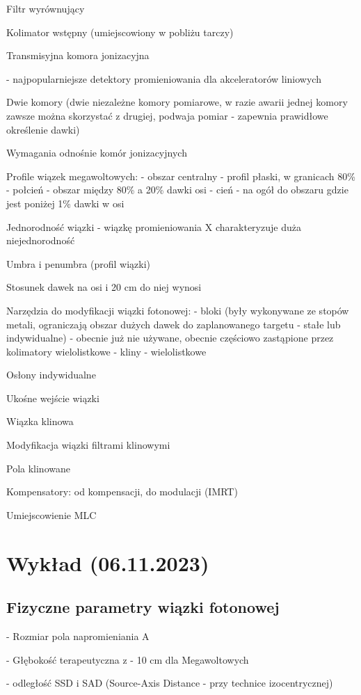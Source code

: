 \documentclass{article}
\begin{document}
Filtr wyrównujący

Kolimator wstępny (umiejscowiony w pobliżu tarczy)

Transmisyjna komora jonizacyjna

- najpopularniejsze detektory promieniowania dla akceleratorów liniowych

Dwie komory (dwie niezależne komory pomiarowe, w razie awarii jednej komory zawsze można skorzystać z drugiej, podwaja pomiar - zapewnia prawidłowe określenie dawki)

Wymagania odnośnie komór jonizacyjnych

Profile wiązek megawoltowych:
- obszar centralny - profil płaski, w granicach 80\%
- połcień - obszar między 80\% a 20\% dawki osi
- cień - na ogół do obszaru gdzie jest poniżej 1\% dawki w osi

Jednorodność wiązki - wiązkę promieniowania X charakteryzuje duża niejednorodność

Umbra i penumbra (profil wiązki)

Stosunek dawek na osi i 20 cm do niej wynosi

Narzędzia do modyfikacji wiązki fotonowej:
- bloki (były wykonywane ze stopów metali, ograniczają obszar dużych dawek do zaplanowanego targetu - stałe lub indywidualne) - obecnie już nie używane, obecnie częściowo zastąpione przez kolimatory wielolistkowe
- kliny
- wielolistkowe

Osłony indywidualne

Ukośne wejście wiązki

Wiązka klinowa

Modyfikacja wiązki filtrami klinowymi

Pola klinowane

Kompensatory: od kompensacji, do modulacji (IMRT)

Umiejscowienie MLC

\section{Wykład (06.11.2023)}

\subsection{Fizyczne parametry wiązki fotonowej}

- Rozmiar pola napromieniania A

- Głębokość terapeutyczna z - 10 cm dla Megawoltowych

- odległość SSD i SAD (Source-Axis Distance - przy technice izocentrycznej)
\end{document}
